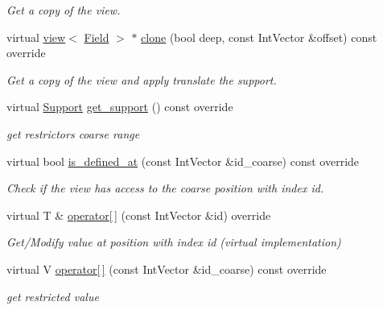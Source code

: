 \begin{DoxyCompactItemize}
\begin{DoxyCompactList}\small\item\em Get a copy of the view. \end{DoxyCompactList}\item 
virtual \hyperlink{classUintah_1_1PhaseField_1_1detail_1_1view}{view}$<$ \hyperlink{structUintah_1_1PhaseField_1_1ScalarField}{Field} $>$ $\ast$ \hyperlink{classUintah_1_1PhaseField_1_1detail_1_1amr__restrictor_3_01ScalarField_3_01T_01_4_00_01Problem_0778720acc9a55f696b8537356a4dbcae_a3150edfe50702f16b12ced6a2ef77903}{clone} (bool deep, const Int\+Vector \&offset) const override
\begin{DoxyCompactList}\small\item\em Get a copy of the view and apply translate the support. \end{DoxyCompactList}\item 
virtual \hyperlink{classUintah_1_1PhaseField_1_1Support}{Support} \hyperlink{classUintah_1_1PhaseField_1_1detail_1_1amr__restrictor_3_01ScalarField_3_01T_01_4_00_01Problem_0778720acc9a55f696b8537356a4dbcae_a9565e793be2d11018a724418e3dd3891}{get\+\_\+support} () const override
\begin{DoxyCompactList}\small\item\em get restrictor\textquotesingle{}s coarse range \end{DoxyCompactList}\item 
virtual bool \hyperlink{classUintah_1_1PhaseField_1_1detail_1_1amr__restrictor_3_01ScalarField_3_01T_01_4_00_01Problem_0778720acc9a55f696b8537356a4dbcae_aa4f6dbd8c7469f348c7c3b8198de37b9}{is\+\_\+defined\+\_\+at} (const Int\+Vector \&id\+\_\+coarse) const override
\begin{DoxyCompactList}\small\item\em Check if the view has access to the coarse position with index id. \end{DoxyCompactList}\item 
virtual T \& \hyperlink{classUintah_1_1PhaseField_1_1detail_1_1amr__restrictor_3_01ScalarField_3_01T_01_4_00_01Problem_0778720acc9a55f696b8537356a4dbcae_a628628a8b49e3a7b7abed79f7f1fe0ea}{operator\mbox{[}$\,$\mbox{]}} (const Int\+Vector \&id) override
\begin{DoxyCompactList}\small\item\em Get/\+Modify value at position with index id (virtual implementation) \end{DoxyCompactList}\item 
virtual V \hyperlink{classUintah_1_1PhaseField_1_1detail_1_1amr__restrictor_3_01ScalarField_3_01T_01_4_00_01Problem_0778720acc9a55f696b8537356a4dbcae_a799928df9c231704c14239ab59173e67}{operator\mbox{[}$\,$\mbox{]}} (const Int\+Vector \&id\+\_\+coarse) const override
\begin{DoxyCompactList}\small\item\em get restricted value \end{DoxyCompactList}\end{DoxyCompactItemize}
